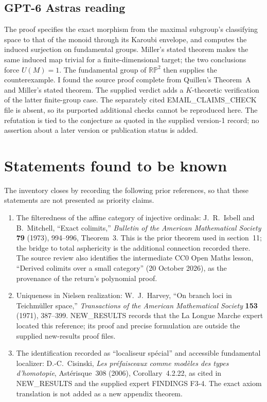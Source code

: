 \subsection*{GPT-6 Astra\textquotesingle s reading}

The proof specifies the exact morphism from the maximal subgroup's classifying space to that of the monoid through its Karoubi envelope, and computes the induced surjection on fundamental groups. Miller's stated theorem makes the same induced map trivial for a finite-dimensional target; the two conclusions force $U(M)=1$. The fundamental group of $\mathbb{RP}^2$ then supplies the counterexample. I found the source proof complete from Quillen's Theorem~A and Miller's stated theorem. The supplied verdict adds a $K$-theoretic verification of the latter finite-group case. The separately cited EMAIL\_CLAIMS\_CHECK file is absent, so its purported additional checks cannot be reproduced here. The refutation is tied to the conjecture as quoted in the supplied version-1 record; no assertion about a later version or publication status is added.

\par\bigskip


\section*{Statements found to be known}
The inventory closes by recording the following prior references, so that these statements are not presented as priority claims.
\begin{enumerate}
\item The filteredness of the affine category of injective ordinals: J.~R.~Isbell and B.~Mitchell, ``Exact colimits,'' \emph{Bulletin of the American Mathematical Society} \textbf{79} (1973), 994--996, Theorem~3. This is the prior theorem used in section~11; the bridge to total asphericity is the additional connection recorded there. The source review also identifies the intermediate CC0 Open Maths lesson, ``Derived colimits over a small category'' (20 October 2026), as the provenance of the return's polynomial proof.
\item Uniqueness in Nielsen realization: W.~J.~Harvey, ``On branch loci in Teichmüller space,'' \emph{Transactions of the American Mathematical Society} \textbf{153} (1971), 387--399. NEW\_RESULTS records that the La Longue Marche expert located this reference; its proof and precise formulation are outside the supplied new-results proof files.
\item The identification recorded as ``localiseur spécial'' and accessible fundamental localizer: D.-C.~Cisinski, \emph{Les préfaisceaux comme modèles des types d'homotopie}, Astérisque~308 (2006), Corollary~4.2.22, as cited in NEW\_RESULTS and the supplied expert FINDINGS F3-4. The exact axiom translation is not added as a new appendix theorem.
\end{enumerate}
\endgroup

